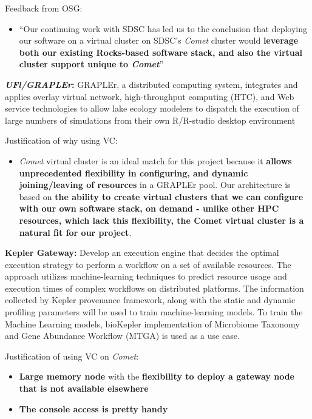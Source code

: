 Feedback from OSG:

\begin{itemize}
\item
  ``Our continuing work with SDSC has led us to the conclusion that
  deploying our software on a virtual cluster on SDSC's \emph{Comet}
  cluster would \textbf{leverage both our existing Rocks-based software
  stack, and also the virtual cluster support unique to \emph{Comet}}''
\end{itemize}

\textbf{\emph{UFl/GRAPLEr}:} GRAPLEr, a distributed computing system,
integrates and applies overlay virtual network, high-throughput
computing (HTC), and Web service technologies to allow lake ecology
modelers to dispatch the execution of large numbers of simulations from
their own R/R-studio desktop environment

Justification of why using VC:

\begin{itemize}
\item
  \emph{Comet} virtual cluster is an ideal match for this project
  because it \textbf{allows unprecedented flexibility in configuring,
  and dynamic joining/leaving of resources} in a GRAPLEr pool. Our
  architecture is based on \textbf{the ability to create virtual
  clusters that we can configure with our own software stack, on demand
  - unlike other HPC resources, which lack this flexibility, the Comet
  virtual cluster is a natural fit for our project}.
\end{itemize}

\textbf{Kepler Gateway:} Develop an execution engine that decides the
optimal execution strategy to perform a workflow on a set of available
resources. The approach utilizes machine-learning techniques to predict
resource usage and execution times of complex workflows on distributed
platforms. The information collected by Kepler provenance framework,
along with the static and dynamic profiling parameters will be used to
train machine-learning models. To train the Machine Learning models,
bioKepler implementation of Microbiome Taxonomy and Gene Abundance
Workflow (MTGA) is used as a use case.

Justification of using VC on \emph{Comet}:

\begin{itemize}
\item
  \textbf{Large memory node} with the \textbf{flexibility to deploy a
  gateway node that is not available elsewhere}
\item
  \textbf{The console access is pretty handy}
\end{itemize}

